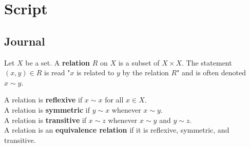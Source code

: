 \documentclass[../main.tex]{subfiles}
\begin{document}
\section{Script}
\subsection{Journal}
\begin{definition}\label{dfn:2.1}
    Let $X$ be a set. A \textbf{relation} $R$ on $X$ is a subset of $X\times X$. The statement $(x,y)\in R$ is read "$x$ is related to $y$ by the relation $R$" and is often denoted $x\sim y$.\par\medskip
    \noindent A relation is \textbf{reflexive} if $x\sim x$ for all $x\in X$.\\
    A relation is \textbf{symmetric} if $y\sim x$ whenever $x\sim y$.\\
    A relation is \textbf{transitive} if $x\sim z$ whenever $x\sim y$ and $y\sim z$.\\
    A relation is an \textbf{equivalence relation} if it is reflexive, symmetric, and transitive.
\end{definition}
\smallskip
\end{document}
